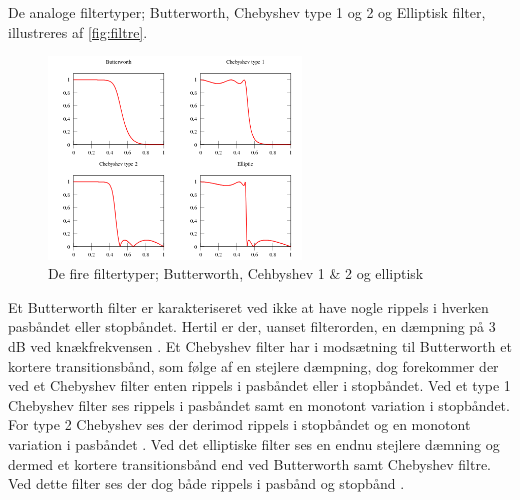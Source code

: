 De analoge filtertyper; Butterworth, Chebyshev type 1 og 2 og Elliptisk filter, illustreres af \autoref{fig:filtre}.

\begin{figure}[H]
\centering
\includegraphics[width=0.6\textwidth]{figures/filtre}
\caption{De fire filtertyper; Butterworth, Cehbyshev 1 \& 2 og elliptisk}
\label{fig:filtre}
\end{figure}

Et Butterworth filter er karakteriseret ved ikke at have nogle rippels i hverken pasbåndet eller stopbåndet. Hertil er der, uanset filterorden, en dæmpning på 3 dB ved knækfrekvensen \citep{nilsson2015}.
Et Chebyshev filter har i modsætning til Butterworth et kortere transitionsbånd, som følge af en stejlere dæmpning, dog forekommer der ved et Chebyshev filter enten rippels i pasbåndet eller i stopbåndet. Ved et type 1 Chebyshev filter ses rippels i pasbåndet samt en monotont variation i stopbåndet. For type 2 Chebyshev ses der derimod rippels i stopbåndet og en monotont variation i pasbåndet \citep{nilsson2015}. 
Ved det elliptiske filter ses en endnu stejlere dæmning og dermed et kortere transitionsbånd end ved Butterworth samt Chebyshev filtre. Ved dette filter ses der dog både rippels i pasbånd og stopbånd \citep{nilsson2015}. 
